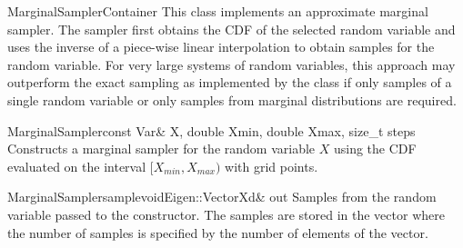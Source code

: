 \documentclass[a4paper, 10pt]{paper}
\begin{document}
\begin{defclassex}{MarginalSampler}{Container}
This class implements an approximate marginal sampler. The sampler first obtains the CDF of the selected random variable and 
uses the inverse of a piece-wise linear interpolation to obtain samples for the random variable. For very large systems of random 
variables, this approach may outperform the exact sampling as implemented by the  class if only samples 
of a single random variable or only samples from marginal distributions are required.

\begin{classsyn}{MarginalSampler}{const Var\& X, double Xmin, double Xmax, size\_t steps}
Constructs a marginal sampler for the random variable $X$ using the CDF evaluated on the interval $[X_{min},X_{max})$ 
with  grid points.
\end{classsyn}

\begin{defmeth}{MarginalSampler}{sample}{void}{Eigen::VectorXd\& out}
Samples from the random variable passed to the constructor. The samples are stored in the  vector where
the number of samples is specified by the number of elements of the vector.
\end{defmeth}
\end{defclassex}
\end{document}
